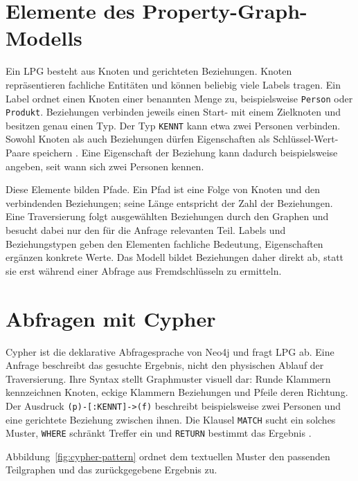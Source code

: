 \section{Elemente des Property-Graph-Modells}

Ein \ac{LPG} besteht aus Knoten und gerichteten Beziehungen. Knoten repräsentieren fachliche Entitäten und können beliebig viele Labels tragen. Ein Label ordnet einen Knoten einer benannten Menge zu, beispielsweise \texttt{Person} oder \texttt{Produkt}. Beziehungen verbinden jeweils einen Start- mit einem Zielknoten und besitzen genau einen Typ. Der Typ \texttt{KENNT} kann etwa zwei Personen verbinden. Sowohl Knoten als auch Beziehungen dürfen Eigenschaften als Schlüssel-Wert-Paare speichern \cite{angles2017foundations,neo4j2026concepts}. Eine Eigenschaft der Beziehung kann dadurch beispielsweise angeben, seit wann sich zwei Personen kennen.

Diese Elemente bilden Pfade. Ein Pfad ist eine Folge von Knoten und den verbindenden Beziehungen; seine Länge entspricht der Zahl der Beziehungen. Eine Traversierung folgt ausgewählten Beziehungen durch den Graphen und besucht dabei nur den für die Anfrage relevanten Teil. Labels und Beziehungstypen geben den Elementen fachliche Bedeutung, Eigenschaften ergänzen konkrete Werte. Das Modell bildet Beziehungen daher direkt ab, statt sie erst während einer Abfrage aus Fremdschlüsseln zu ermitteln.

\section{Abfragen mit Cypher}

Cypher ist die deklarative Abfragesprache von Neo4j und fragt \ac{LPG} ab. Eine Anfrage beschreibt das gesuchte Ergebnis, nicht den physischen Ablauf der Traversierung. Ihre Syntax stellt Graphmuster visuell dar: Runde Klammern kennzeichnen Knoten, eckige Klammern Beziehungen und Pfeile deren Richtung. Der Ausdruck \texttt{(p)-[:KENNT]->(f)} beschreibt beispielsweise zwei Personen und eine gerichtete Beziehung zwischen ihnen. Die Klausel \texttt{MATCH} sucht ein solches Muster, \texttt{WHERE} schränkt Treffer ein und \texttt{RETURN} bestimmt das Ergebnis \cite{neo4j2026cypher}.

Abbildung~\ref{fig:cypher-pattern} ordnet dem textuellen Muster den passenden Teilgraphen und das zurückgegebene Ergebnis zu.

